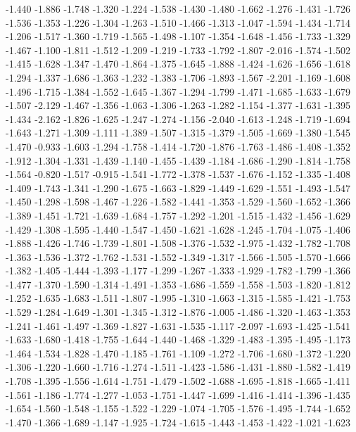 \documentclass[9pt]{article}
\theoremstyle{plain}
\theoremstyle{definition}
\theoremstyle{remark}
\numberwithin{equation}{section}
\begin{document}
-1.440
-1.886
-1.748
-1.320
-1.224
-1.538
-1.430
-1.480
-1.662
-1.276
-1.431
-1.726
-1.536
-1.353
-1.226
-1.304
-1.263
-1.510
-1.466
-1.313
-1.047
-1.594
-1.434
-1.714
-1.206
-1.517
-1.360
-1.719
-1.565
-1.498
-1.107
-1.354
-1.648
-1.456
-1.733
-1.329
-1.467
-1.100
-1.811
-1.512
-1.209
-1.219
-1.733
-1.792
-1.807
-2.016
-1.574
-1.502
-1.415
-1.628
-1.347
-1.470
-1.864
-1.375
-1.645
-1.888
-1.424
-1.626
-1.656
-1.618
-1.294
-1.337
-1.686
-1.363
-1.232
-1.383
-1.706
-1.893
-1.567
-2.201
-1.169
-1.608
-1.496
-1.715
-1.384
-1.552
-1.645
-1.367
-1.294
-1.799
-1.471
-1.685
-1.633
-1.679
-1.507
-2.129
-1.467
-1.356
-1.063
-1.306
-1.263
-1.282
-1.154
-1.377
-1.631
-1.395
-1.434
-2.162
-1.826
-1.625
-1.247
-1.274
-1.156
-2.040
-1.613
-1.248
-1.719
-1.694
-1.643
-1.271
-1.309
-1.111
-1.389
-1.507
-1.315
-1.379
-1.505
-1.669
-1.380
-1.545
-1.470
-0.933
-1.603
-1.294
-1.758
-1.414
-1.720
-1.876
-1.763
-1.486
-1.408
-1.352
-1.912
-1.304
-1.331
-1.439
-1.140
-1.455
-1.439
-1.184
-1.686
-1.290
-1.814
-1.758
-1.564
-0.820
-1.517
-0.915
-1.541
-1.772
-1.378
-1.537
-1.676
-1.152
-1.335
-1.408
-1.409
-1.743
-1.341
-1.290
-1.675
-1.663
-1.829
-1.449
-1.629
-1.551
-1.493
-1.547
-1.450
-1.298
-1.598
-1.467
-1.226
-1.582
-1.441
-1.353
-1.529
-1.560
-1.652
-1.366
-1.389
-1.451
-1.721
-1.639
-1.684
-1.757
-1.292
-1.201
-1.515
-1.432
-1.456
-1.629
-1.429
-1.308
-1.595
-1.440
-1.547
-1.450
-1.621
-1.628
-1.245
-1.704
-1.075
-1.406
-1.888
-1.426
-1.746
-1.739
-1.801
-1.508
-1.376
-1.532
-1.975
-1.432
-1.782
-1.708
-1.363
-1.536
-1.372
-1.762
-1.531
-1.552
-1.349
-1.317
-1.566
-1.505
-1.570
-1.666
-1.382
-1.405
-1.444
-1.393
-1.177
-1.299
-1.267
-1.333
-1.929
-1.782
-1.799
-1.366
-1.477
-1.370
-1.590
-1.314
-1.491
-1.353
-1.686
-1.559
-1.558
-1.503
-1.820
-1.812
-1.252
-1.635
-1.683
-1.511
-1.807
-1.995
-1.310
-1.663
-1.315
-1.585
-1.421
-1.753
-1.529
-1.284
-1.649
-1.301
-1.345
-1.312
-1.876
-1.005
-1.486
-1.320
-1.463
-1.353
-1.241
-1.461
-1.497
-1.369
-1.827
-1.631
-1.535
-1.117
-2.097
-1.693
-1.425
-1.541
-1.633
-1.680
-1.418
-1.755
-1.644
-1.440
-1.468
-1.329
-1.483
-1.395
-1.495
-1.173
-1.464
-1.534
-1.828
-1.470
-1.185
-1.761
-1.109
-1.272
-1.706
-1.680
-1.372
-1.220
-1.306
-1.220
-1.660
-1.716
-1.274
-1.511
-1.423
-1.586
-1.431
-1.880
-1.582
-1.419
-1.708
-1.395
-1.556
-1.614
-1.751
-1.479
-1.502
-1.688
-1.695
-1.818
-1.665
-1.411
-1.561
-1.186
-1.774
-1.277
-1.053
-1.751
-1.447
-1.699
-1.416
-1.414
-1.396
-1.435
-1.654
-1.560
-1.548
-1.155
-1.522
-1.229
-1.074
-1.705
-1.576
-1.495
-1.744
-1.652
-1.470
-1.366
-1.689
-1.147
-1.925
-1.724
-1.615
-1.443
-1.453
-1.422
-1.021
-1.623
\end{document}
